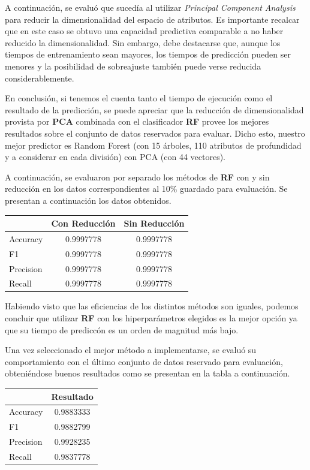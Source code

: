\documentclass{article}
\begin{document}
A continuación, se evaluó que sucedía al utilizar \textit{Principal Component Analysis} para reducir la dimensionalidad del espacio de atributos. Es importante recalcar que en este caso se obtuvo una capacidad predictiva comparable a no haber reducido la dimensionalidad. Sin embargo, debe destacarse que, aunque los tiempos de entrenamiento sean mayores, los tiempos de predicción pueden ser menores y la posibilidad de sobreajuste también puede verse reducida considerablemente.

En conclusión, si tenemos el cuenta tanto el tiempo de ejecución como el resultado de la predicción, se puede apreciar que la reducción de dimensionalidad provista por \textbf{PCA} combinada con el clasificador \textbf{RF} provee los mejores resultados sobre el conjunto de datos reservados para evaluar. Dicho esto, nuestro mejor predictor es Random Forest (con 15 árboles, 110 atributos de profundidad y a considerar en cada división) con PCA (con 44 vectores).

A continuación, se evaluaron por separado los métodos de \textbf{RF} con y sin reducción en los datos correspondientes al 10$\%$ guardado para evaluación. Se presentan a continuación los datos obtenidos.

\begin{center}
  \begin{tabular}{| l | c | c |}
    \hline
      & Con Reducción & Sin Reducción  \\ \hline
    Accuracy & 0.9997778 & 0.9997778 \\ \hline
    F1 & 0.9997778 & 0.9997778 \\ \hline
    Precision & 0.9997778 & 0.9997778 \\ \hline
    Recall & 0.9997778 & 0.9997778 \\
    \hline
  \end{tabular}
\end{center}

Habiendo visto que las eficiencias de los distintos métodos son iguales, podemos concluir que utilizar \textbf{RF} con los hiperparámetros elegidos es la mejor opción ya que su tiempo de prediccón es un orden de magnitud más bajo.

Una vez seleccionado el mejor método a implementarse, se evaluó su comportamiento con el último conjunto de datos reservado para evaluación, obteniéndose buenos resultados como se presentan en la tabla a continuación.

\begin{center}
  \begin{tabular}{| l | c |}
    \hline
      & Resultado  \\ \hline
    Accuracy & 0.9883333 \\ \hline
    F1 & 0.9882799 \\ \hline
    Precision & 0.9928235 \\ \hline
    Recall & 0.9837778 \\
    \hline
  \end{tabular}
\end{center}
\end{document}
